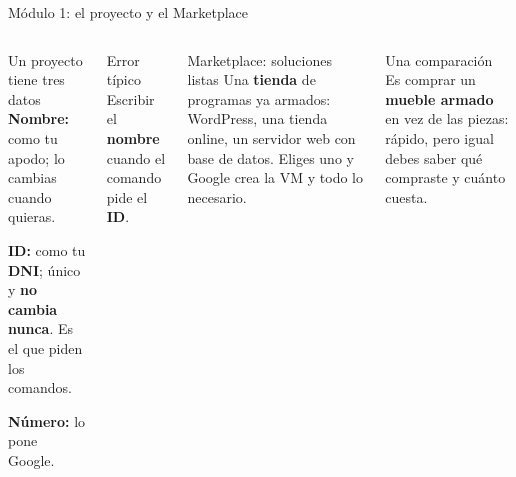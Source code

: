 \documentclass[aspectratio=169,10pt,c]{beamer}
\begin{document}
\begin{frame}{Módulo 1: el proyecto y el Marketplace}
\begin{columns}[T,onlytextwidth]
\begin{block}{Un proyecto tiene tres datos}
\small
\textbf{Nombre:} como tu apodo; lo cambias cuando quieras.\par\smallskip
\textbf{ID:} como tu \textbf{DNI}; único y \textbf{no cambia nunca}. Es el que piden los comandos.\par\smallskip
\textbf{Número:} lo pone Google.
\end{block}
\begin{alertblock}{Error típico}
\small Escribir el \textbf{nombre} cuando el comando pide el \textbf{ID}.
\end{alertblock}
\begin{exampleblock}{Marketplace: soluciones listas}
\small Una \textbf{tienda} de programas ya armados: WordPress, una tienda online, un servidor web con base de datos. Eliges uno y Google crea la VM y todo lo necesario.
\end{exampleblock}
\begin{block}{Una comparación}
\small Es comprar un \textbf{mueble armado} en vez de las piezas: rápido, pero igual debes saber qué compraste y cuánto cuesta.
\end{block}
\end{columns}
\end{frame}
\end{document}
